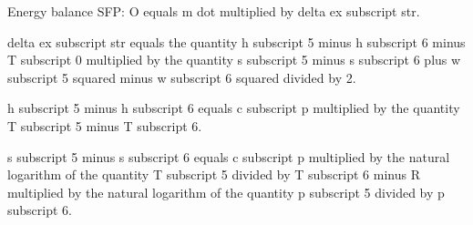 Energy balance SFP:  
O equals m dot multiplied by delta ex subscript str.  

delta ex subscript str equals the quantity h subscript 5 minus h subscript 6 minus T subscript 0 multiplied by the quantity s subscript 5 minus s subscript 6 plus w subscript 5 squared minus w subscript 6 squared divided by 2.  

h subscript 5 minus h subscript 6 equals c subscript p multiplied by the quantity T subscript 5 minus T subscript 6.  

s subscript 5 minus s subscript 6 equals c subscript p multiplied by the natural logarithm of the quantity T subscript 5 divided by T subscript 6 minus R multiplied by the natural logarithm of the quantity p subscript 5 divided by p subscript 6.